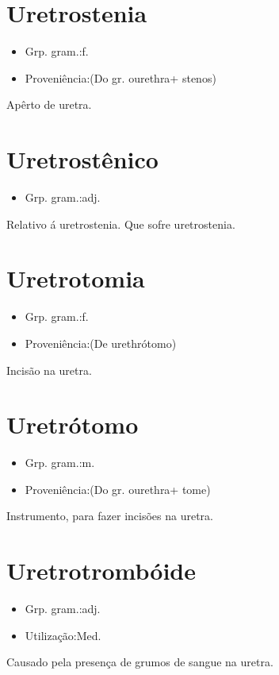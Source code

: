 \documentclass{article}
\begin{document}
\section{Uretrostenia}
\begin{itemize}
\item {Grp. gram.:f.}
\end{itemize}
\begin{itemize}
\item {Proveniência:(Do gr. \textunderscore ourethra\textunderscore  + \textunderscore stenos\textunderscore )}
\end{itemize}
Apêrto de uretra.
\section{Uretrostênico}
\begin{itemize}
\item {Grp. gram.:adj.}
\end{itemize}
Relativo á uretrostenia.
Que sofre uretrostenia.
\section{Uretrotomia}
\begin{itemize}
\item {Grp. gram.:f.}
\end{itemize}
\begin{itemize}
\item {Proveniência:(De \textunderscore urethrótomo\textunderscore )}
\end{itemize}
Incisão na uretra.
\section{Uretrótomo}
\begin{itemize}
\item {Grp. gram.:m.}
\end{itemize}
\begin{itemize}
\item {Proveniência:(Do gr. \textunderscore ourethra\textunderscore  + \textunderscore tome\textunderscore )}
\end{itemize}
Instrumento, para fazer incisões na uretra.
\section{Uretrotrombóide}
\begin{itemize}
\item {Grp. gram.:adj.}
\end{itemize}
\begin{itemize}
\item {Utilização:Med.}
\end{itemize}
Causado pela presença de grumos de sangue na uretra.
\end{document}
